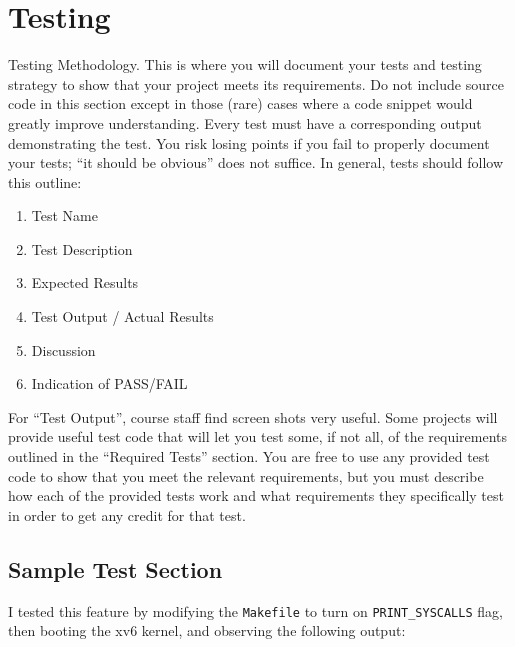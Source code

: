 \documentclass[11pt,letterpaper]{report}
\begin{document}
	\section*{Testing}
	Testing Methodology. This is where you will document your tests and testing strategy to show that your project meets its requirements. Do not include source code in this section except in those (rare) cases where a code snippet would greatly improve understanding. Every test must have a corresponding output demonstrating the test. You risk losing points if you fail to properly document your tests; ``it should be obvious'' does not suffice. In general, tests should follow this outline:
		\begin{enumerate}
			\item Test Name
			\item Test Description
			\item Expected Results
			\item Test Output / Actual Results
			\item Discussion
			\item Indication of PASS/FAIL
		\end{enumerate}

		For ``Test Output'', course staff find screen shots very useful.
		Some projects will provide useful test code that will let you test some, if not all, of the requirements outlined in the ``Required Tests'' section. You are free to use any provided test code to show that you meet the relevant requirements, but you must describe how each of the provided tests work and what requirements they specifically test in order to get any credit for that test.

	\subsection*{Sample Test Section}
	I tested this feature by modifying the {\tt Makefile} to turn on {\tt PRINT\_SYSCALLS} flag, then booting the xv6 kernel, and observing the following output:
\end{document}
